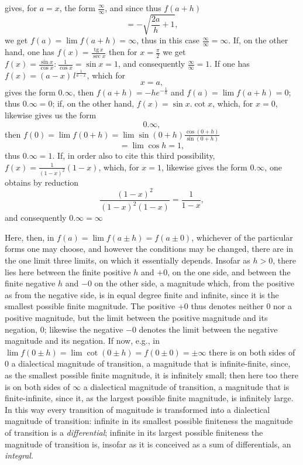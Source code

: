 \documentclass[12pt,a4paper,openany]{book}
\newcommand{\opage}[1]{\marginnote{\footnotesize\textit{[#1]}}}
\begin{document}
gives, for $a=x$, the form $\frac{\infty}{\infty}$, and since thus $f(a+h)$
\[ =-\sqrt{\frac{2a}{h}+1}, \]
we get $f(a)=\lim f(a+h)=\infty$, thus
in this case $\frac{\infty}{\infty}=\infty$. If, on the other hand, one has $f(x)=\frac{\mathrm{tg}\,x}{\sec x}$
then for $x=\frac{\pi}{2}$ we get $f(x)=\frac{\sin x}{\cos x}:\frac{1}{\cos x}=\sin x=1$, and consequently $\frac{\infty}{\infty}=1$. If one has $f(x)=(a-x)\,l^{\frac{1}{a-x}}$, which for
\[ x=a, \]
gives the form $0.\infty$, then $f(a+h)=-he^{-\frac{1}{h}}$
and $f(a)=\lim f(a+h)=0$; thus $0.\infty=0$; if, on the other hand,
$f(x)=\sin x.\cot x$, which, for $x=0$, likewise gives us the form
\[ 0.\infty, \]
then $f(0)=\lim f(0+h)=\lim\sin(0+h)\frac{\cos(0+h)}{\sin(0+h)}$
\[ =\lim\cos h=1, \]
thus $0.\infty=1$. If, in order also to
cite this third possibility, $f(x)=\frac{1}{(1-x)^{2}}(1-x)$,
which, for $x=1$, likewise gives the form $0.\infty$, one obtains
by reduction
\[ \frac{(1-x)^{2}}{(1-x)^{2}(1-x)}=\frac{1}{1-x}, \]
and consequently $0.\infty=\infty$

Here, then, in $f(a)=\lim f(a\pm h)=f(a\pm 0)$, whichever
of the particular forms one may choose, and however
the conditions may be changed, there are in the one limit three limits,
on which it essentially depends. Insofar as $h>0$, there lies
\setcounter{footnote}{0}%
\opage{76}here between the finite positive $h$ and $+0$, on the one side,
and between the finite negative $h$ and $-0$ on the other
side, a magnitude which, from the positive as from the negative
side, is in equal degree finite and infinite, since it is the
smallest possible finite magnitude. The positive $+0$ thus denotes neither $0$ nor a positive magnitude, but the limit
between the positive magnitude and its negation, $0$; likewise the negative $-0$ denotes the limit between the
negative magnitude and its negation. If now, e.g., in $\lim f(0\pm h)=\lim\cot(0\pm h)=f(0\pm 0)=\pm\infty$ there is on
both sides of $0$ a dialectical magnitude of transition, a magnitude
that is infinite-finite, since, as the smallest
possible finite magnitude, it is infinitely small; then here too there is
on both sides of $\infty$ a dialectical magnitude of transition, a
magnitude that is finite-infinite, since it, as the largest
possible finite magnitude, is infinitely large. In this way
every transition of magnitude is transformed into a dialectical
magnitude of transition: infinite in its smallest possible finiteness
the magnitude of transition is a \emph{differential}; infinite in its largest
possible finiteness the magnitude of transition is, insofar as it is
conceived as a sum of differentials, an \emph{integral}.
\end{document}
